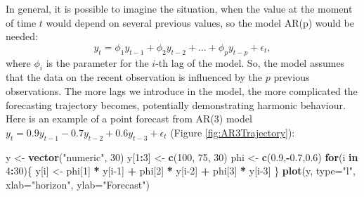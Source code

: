 \documentclass[]{book}
\newenvironment{Shaded}{\begin{snugshade}}{\end{snugshade}}
\newcommand{\ControlFlowTok}[1]{\textcolor[rgb]{0.13,0.29,0.53}{\textbf{#1}}}
\newcommand{\DataTypeTok}[1]{\textcolor[rgb]{0.13,0.29,0.53}{#1}}
\newcommand{\DecValTok}[1]{\textcolor[rgb]{0.00,0.00,0.81}{#1}}
\newcommand{\FloatTok}[1]{\textcolor[rgb]{0.00,0.00,0.81}{#1}}
\newcommand{\KeywordTok}[1]{\textcolor[rgb]{0.13,0.29,0.53}{\textbf{#1}}}
\newcommand{\NormalTok}[1]{#1}
\newcommand{\OperatorTok}[1]{\textcolor[rgb]{0.81,0.36,0.00}{\textbf{#1}}}
\newcommand{\StringTok}[1]{\textcolor[rgb]{0.31,0.60,0.02}{#1}}
\theoremstyle{definition}
\theoremstyle{definition}
\theoremstyle{definition}
\theoremstyle{definition}
\theoremstyle{remark}
\begin{document}
In general, it is possible to imagine the situation, when the value at the moment of time \(t\) would depend on several previous values, so the model AR(p) would be needed:
\begin{equation}
  {y}_{t} = \phi_1 y_{t-1} + \phi_2 y_{t-2} + \dots + \phi_p y_{t-p} + \epsilon_t ,
  \label{eq:ARIMAp00Example}
\end{equation}
where \(\phi_i\) is the parameter for the \(i\)-th lag of the model. So, the model assumes that the data on the recent observation is influenced by the \(p\) previous observations. The more lags we introduce in the model, the more complicated the forecasting trajectory becomes, potentially demonstrating harmonic behaviour. Here is an example of a point forecast from AR(3) model \({y}_{t} = 0.9 y_{t-1} -0.7 y_{t-2} + 0.6 y_{t-3} + \epsilon_t\) (Figure \ref{fig:AR3Trajectory}):

\begin{Shaded}
\begin{Highlighting}[]
\NormalTok{y <-}\StringTok{ }\KeywordTok{vector}\NormalTok{(}\StringTok{"numeric"}\NormalTok{, }\DecValTok{30}\NormalTok{)}
\NormalTok{y[}\DecValTok{1}\OperatorTok{:}\DecValTok{3}\NormalTok{] <-}\StringTok{ }\KeywordTok{c}\NormalTok{(}\DecValTok{100}\NormalTok{, }\DecValTok{75}\NormalTok{, }\DecValTok{30}\NormalTok{)}
\NormalTok{phi <-}\StringTok{ }\KeywordTok{c}\NormalTok{(}\FloatTok{0.9}\NormalTok{,}\OperatorTok{-}\FloatTok{0.7}\NormalTok{,}\FloatTok{0.6}\NormalTok{)}
\ControlFlowTok{for}\NormalTok{(i }\ControlFlowTok{in} \DecValTok{4}\OperatorTok{:}\DecValTok{30}\NormalTok{)\{}
\NormalTok{    y[i] <-}\StringTok{ }\NormalTok{phi[}\DecValTok{1}\NormalTok{] }\OperatorTok{*}\StringTok{ }\NormalTok{y[i}\DecValTok{-1}\NormalTok{] }\OperatorTok{+}\StringTok{ }\NormalTok{phi[}\DecValTok{2}\NormalTok{] }\OperatorTok{*}\StringTok{ }\NormalTok{y[i}\DecValTok{-2}\NormalTok{] }\OperatorTok{+}\StringTok{ }\NormalTok{phi[}\DecValTok{3}\NormalTok{] }\OperatorTok{*}\StringTok{ }\NormalTok{y[i}\DecValTok{-3}\NormalTok{]}
\NormalTok{\}}
\KeywordTok{plot}\NormalTok{(y, }\DataTypeTok{type=}\StringTok{"l"}\NormalTok{, }\DataTypeTok{xlab=}\StringTok{"horizon"}\NormalTok{, }\DataTypeTok{ylab=}\StringTok{"Forecast"}\NormalTok{)}
\end{Highlighting}
\end{Shaded}
\end{document}
